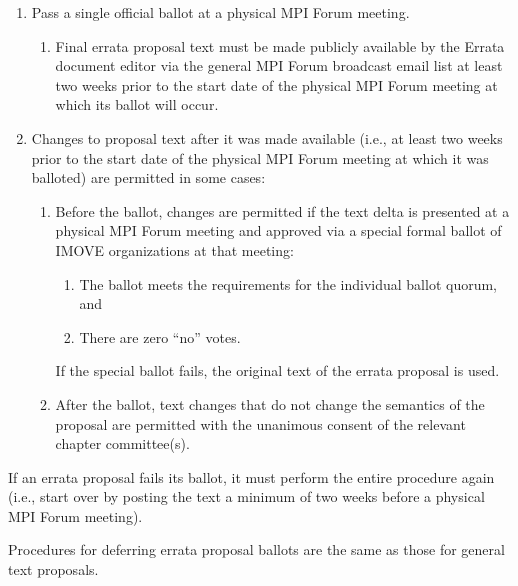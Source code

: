 \begin{enumerate}

\item Pass a single official ballot at a physical MPI Forum meeting.
  \begin{enumerate}
  \item Final errata proposal text must be made publicly available by
    the Errata document editor via the general MPI Forum broadcast
    email list at least two weeks prior to the start date of the
    physical MPI Forum meeting at which its ballot will occur.
  \end{enumerate}

\item Changes to proposal text after it was made available (i.e., at
  least two weeks prior to the start date of the physical MPI Forum
  meeting at which it was balloted) are permitted in some cases:
  \begin{enumerate}
  \item Before the ballot, changes are permitted if the text delta is
    presented at a physical MPI Forum meeting and approved via a
    special formal ballot of IMOVE organizations at that meeting:
    \begin{enumerate}
    \item The ballot meets the requirements for the individual
      ballot quorum, and
    \item There are zero ``no'' votes.
    \end{enumerate}
    
    If the special ballot fails, the original text of the errata
    proposal is used.
  \item After the ballot, text changes that do not change the
    semantics of the proposal are permitted with the unanimous consent
    of the relevant chapter committee(s).
  \end{enumerate}
\end{enumerate}

If an errata proposal fails its ballot, it must perform the entire
procedure again (i.e., start over by posting the text a minimum of two
weeks before a physical MPI Forum meeting).

Procedures for deferring errata proposal ballots are the same as
those for general text proposals.


